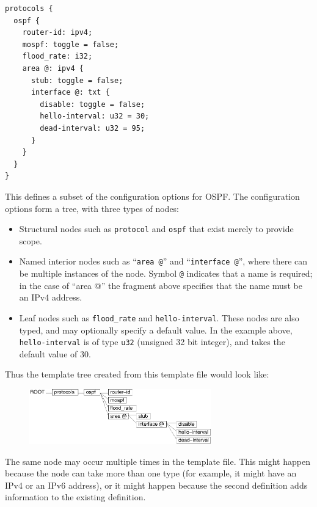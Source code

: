 \documentclass[11pt]{article}
\begin{document}
\begin{verbatim}
protocols {
  ospf {
    router-id: ipv4;
    mospf: toggle = false;
    flood_rate: i32;
    area @: ipv4 {
      stub: toggle = false;
      interface @: txt {
        disable: toggle = false;
        hello-interval: u32 = 30;
        dead-interval: u32 = 95;
      }
    }
  }
}
\end{verbatim}

This defines a subset of the configuration options for OSPF.  The
configuration options form a tree, with three types of nodes:

\begin{itemize}

  \item Structural nodes such as {\tt protocol} and {\tt ospf} that exist
  merely to provide scope.

  \item Named interior nodes such as ``{\tt area @}'' and
  ``{\tt interface @}'', where there can be multiple instances of the node.
  Symbol {\tt @} indicates that a name is required; in the case of ``area @''
  the fragment above specifies that the name must be an IPv4 address.

  \item Leaf nodes such as  {\tt flood\_rate} and
  {\tt hello-interval}.  These nodes are also typed, and may optionally
  specify a default value.  In the example above, {\tt hello-interval} is
  of type {\tt u32} (unsigned 32 bit integer), and takes the default value of
  30.

\end{itemize}

Thus the template tree created from this template file would look like:

\begin{figure}[htb]
\centerline{\includegraphics[width=0.7\textwidth]{figs/template}}
\vspace{.05in}
\end{figure}

The same node may occur multiple times in the template file.  This
might happen because the node can take more than one type (for
example, it might have an IPv4 or an IPv6 address), or it might happen
because the second definition adds information to the existing
definition.
\end{document}
